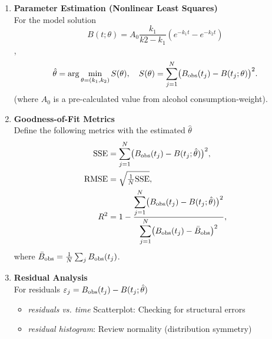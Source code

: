 \documentclass[11pt]{article}
\begin{document}
\begin{enumerate}
  \item \textbf{Parameter Estimation (Nonlinear Least Squares)}\\
    For the model solution \[B(t;\theta)=A_0\frac{k_1}{k2-k_1}(e^{-k_1t}-e^{-k_2t})\], 
    \[
      \hat\theta
      = \arg\min_{\theta=(k_1,k_2)} 
        S(\theta),\quad
      S(\theta)=\sum_{j=1}^N\bigl(B_{\rm obs}(t_j)-B(t_j;\theta)\bigr)^2.
    \]
    (where \(A_0\) is a pre-calculated value from alcohol consumption-weight).

  \item \textbf{Goodness-of-Fit Metrics}\\
    Define the following metrics with the estimated \(\hat\theta\)
    \begin{align*}
      \mathrm{SSE}   &= \sum_{j=1}^N\bigl(B_{\rm obs}(t_j)-B(t_j;\hat\theta)\bigr)^2,\\
      \mathrm{RMSE}  &= \sqrt{\tfrac{1}{N}\mathrm{SSE}},\\
      R^2            &= 1 
        - \frac{\displaystyle\sum_{j=1}^N\bigl(B_{\rm obs}(t_j)-B(t_j;\hat\theta)\bigr)^2}
               {\displaystyle\sum_{j=1}^N\bigl(B_{\rm obs}(t_j)-\bar B_{\rm obs}\bigr)^2},
    \end{align*}
    where \(\bar B_{\rm obs}=\frac1N\sum_j B_{\rm obs}(t_j)\).

  \item \textbf{Residual Analysis}\\
    For residuals \(\varepsilon_j = B_{\rm obs}(t_j)-B(t_j;\hat\theta)\)
    \begin{itemize}
      \item \emph{residuals vs. time} Scatterplot: Checking for structural errors
      \item \emph{residual histogram}: Review normality (distribution symmetry)
    \end{itemize}



\end{enumerate}
\end{document}
